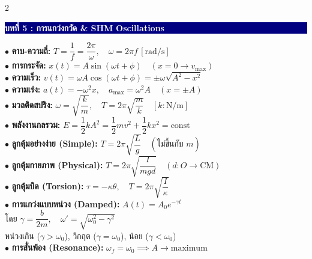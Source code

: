 \documentclass[10pt, a5paper]{article}
\newcommand{\boxheader}[2]{%
  \noindent\colorbox{navy}{\parbox{\dimexpr\linewidth-2\fboxsep}{%
    \textbf{\textcolor{white}{\small #1}} \hfill \textbf{\textcolor{white}{\scriptsize #2}}%
  }}\vspace{1.5pt}%
}
\begin{document}
\begin{multicols}{2}
\setlength{\columnsep}{5pt}

\boxheader{บทที่ 5 : การแกว่งกวัด & SHM}{Oscillations}
\begin{tcolorbox}[colback=boxbg, colframe=navy, boxrule=0.6pt, arc=1.5pt, left=2.5pt, right=2.5pt, top=2.5pt, bottom=2.5pt]
{\fontsize{7.8}{9.5}\selectfont
$\bullet$ \textbf{คาบ-ความถี่:} $T = \dfrac{1}{f} = \dfrac{2\pi}{\omega}, \quad \omega = 2\pi f\,\left[\text{rad/s}\right]$\\[1pt]
$\bullet$ \textbf{การกระจัด:} $x(t) = A\sin(\omega t + \phi) \quad (x=0 \to v_{\max})$\\[1pt]
$\bullet$ \textbf{ความเร็ว:} $v(t) = \omega A\cos(\omega t + \phi) = \pm\omega\sqrt{A^2 - x^2}$\\[1pt]
$\bullet$ \textbf{ความเร่ง:} $a(t) = -\omega^2 x, \quad a_{\max} = \omega^2 A \quad (x=\pm A)$\\[1pt]
$\bullet$ \textbf{มวลติดสปริง:} $\omega = \sqrt{\dfrac{k}{m}}, \quad T = 2\pi\sqrt{\dfrac{m}{k}} \quad [k: \text{N/m}]$\\[1pt]
$\bullet$ \textbf{พลังงานกลรวม:} $E = \dfrac{1}{2}kA^2 = \dfrac{1}{2}mv^2 + \dfrac{1}{2}kx^2 = \text{const}$\\[1pt]
$\bullet$ \textbf{ลูกตุ้มอย่างง่าย (Simple):} $T = 2\pi\sqrt{\dfrac{L}{g}} \quad (\text{ไม่ขึ้นกับ } m)$\\[1pt]
$\bullet$ \textbf{ลูกตุ้มกายภาพ (Physical):} $T = 2\pi\sqrt{\dfrac{I}{mgd}} \quad (d: O \to \text{CM})$\\[1pt]
$\bullet$ \textbf{ลูกตุ้มบิด (Torsion):} $\tau = -\kappa\theta, \quad T = 2\pi\sqrt{\dfrac{I}{\kappa}}$\\[1pt]
$\bullet$ \textbf{การแกว่งแบบหน่วง (Damped):} $A(t) = A_0 e^{-\gamma t}$\\[1pt]
\phantom{$\bullet$} โดย $\gamma = \dfrac{b}{2m}, \quad \omega' = \sqrt{\omega_0^2 - \gamma^2}$\\[1pt]
\phantom{$\bullet$} หน่วงเกิน ($\gamma > \omega_0$), วิกฤต ($\gamma = \omega_0$), น้อย ($\gamma < \omega_0$)\\[1pt]
$\bullet$ \textbf{การสั่นพ้อง (Resonance):} $\omega_f = \omega_0 \implies A \to \text{maximum}$
}
\end{tcolorbox}

\vfill\null
\columnbreak


\end{multicols}
\end{document}
